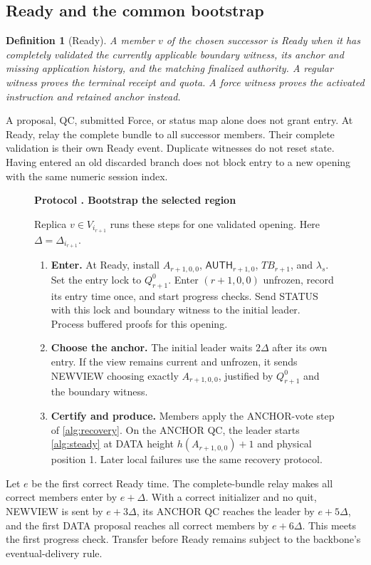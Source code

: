 \documentclass[11pt,a4paper]{article}
\newcommand{\TB}{\mathit{TB}}
\newcommand{\tagg}[1]{\ensuremath{\mathsf{#1}}}
\newtheorem{definition}{Definition}[section]
\newcounter{protocol}
\newenvironment{protocol}[2]{\begin{figure}[htbp]\refstepcounter{protocol}\label{#1}
\begin{mdframed}[linewidth=.6pt,skipabove=0pt,skipbelow=0pt,
innertopmargin=7pt,innerbottommargin=7pt]\small
\textbf{Protocol \theprotocol. #2}\par\smallskip}{\end{mdframed}\end{figure}}
\begin{document}
\subsection{Ready and the common bootstrap}
\label{sec:ready}
\begin{definition}[Ready]
\label{def:ready}
A member $v$ of the chosen successor is Ready when it has completely
validated the currently applicable boundary witness, its anchor and
missing application history, and the matching finalized authority.
A regular witness proves the terminal receipt and quota. A force
witness proves the activated instruction and retained anchor instead.
\end{definition}
A proposal, QC, submitted Force, or status map alone does not grant entry.
At Ready, relay the complete bundle to all successor members. Their
complete validation is their own Ready event. Duplicate witnesses do
not reset state. Having entered an old discarded branch does not block
entry to a new opening with the same numeric session index.

\begin{protocol}{alg:bootstrap}{Bootstrap the selected region}
Replica $v\in V_{i_{r+1}}$ runs these steps for one validated opening.
Here $\Delta=\Delta_{i_{r+1}}$.
\begin{enumerate}[label=\textbf{\arabic*)},itemsep=3pt]
\item \textbf{Enter.} At Ready, install $A_{r+1,0,0}$,
$\tagg{AUTH}_{r+1,0}$, $\TB_{r+1}$, and $\lambda_s$. Set the entry lock
to $Q^0_{r+1}$. Enter $(r+1,0,0)$ unfrozen, record its entry time once,
and start progress checks. Send STATUS with this lock and boundary
witness to the initial leader. Process buffered proofs for this opening.
\item \textbf{Choose the anchor.} The initial leader waits $2\Delta$
after its own entry. If the view remains current and unfrozen, it sends
NEWVIEW choosing exactly $A_{r+1,0,0}$, justified by $Q^0_{r+1}$ and
the boundary witness.
\item \textbf{Certify and produce.} Members apply the ANCHOR-vote step
of \cref{alg:recovery}. On the ANCHOR QC, the leader starts
\cref{alg:steady} at DATA height $h(A_{r+1,0,0})+1$ and physical
position 1. Later local failures use the same recovery protocol.
\end{enumerate}
\end{protocol}

Let $e$ be the first correct Ready time. The complete-bundle relay makes
all correct members enter by $e+\Delta$. With a correct initializer and
no quit, NEWVIEW is sent by $e+3\Delta$, its ANCHOR QC reaches the
leader by $e+5\Delta$, and the first DATA proposal reaches all correct
members by $e+6\Delta$. This meets the first progress check. Transfer
before Ready remains subject to the backbone's eventual-delivery rule.
\end{document}
